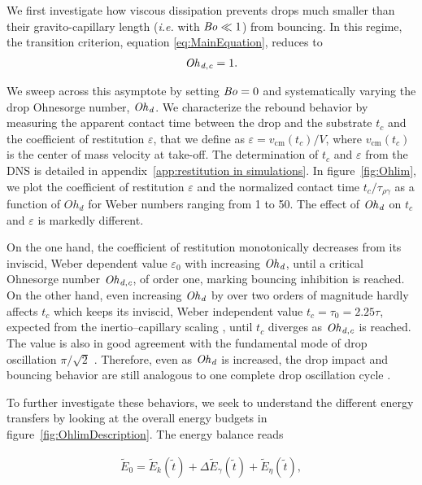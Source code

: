 We first investigate how viscous dissipation prevents drops much smaller than their gravito-capillary length (\emph{i.e.} with $\mathit{Bo} \ll 1$) from bouncing. In this regime, the transition criterion, equation \eqref{eq:MainEquation}, reduces to
\begin{align}
	\mathit{Oh}_\mathit{d,c} = 1.
\end{align}

\noindent We sweep across this asymptote by setting $\mathit{Bo} = 0$ and systematically varying the drop Ohnesorge number, $\mathit{Oh}_\mathit{d}$. We characterize the rebound behavior by measuring the apparent contact time between the drop and the substrate $t_c$ and the coefficient of restitution $\varepsilon$, that we define as $\varepsilon = v_\text{cm}(t_c)/V$, where $v_\text{cm}(t_c)$ is the center of mass velocity at take-off.
The determination of $t_c$ and $\varepsilon$ from the DNS is detailed in appendix~\ref{app:restitution in simulations}. In figure~\ref{fig:Ohlim}, we plot the coefficient of restitution $\varepsilon$ and the normalized contact time $t_c/\tau_{\rho\gamma}$ as a function of $Oh_d$ for Weber numbers ranging from 1 to 50. The effect of $\mathit{Oh}_\mathit{d}$ on $t_c$ and $\varepsilon$ is markedly different. 

On the one hand, the coefficient of restitution monotonically decreases from its inviscid, Weber dependent value $\varepsilon_0$ with increasing $\mathit{Oh}_\mathit{d}$, until a critical Ohnesorge number $\mathit{Oh}_\mathit{d,c}$, of order one, marking bouncing inhibition is reached. On the other hand, even increasing $\mathit{Oh}_\mathit{d}$ by over two orders of magnitude hardly affects $t_c$ which keeps its inviscid, Weber independent value $t_c = \tau_0 = 2.25\tau$, expected from the inertio--capillary scaling \citep{wachters1966heat, richard2002contact}, until $t_c$ diverges as $\mathit{Oh}_\mathit{d,c}$ is reached. The value is also in good agreement with the fundamental mode of drop oscillation $\pi/\sqrt 2$ \citep{rayleigh1879capillary}. Therefore, even as $\mathit{Oh}_\mathit{d}$ is increased, the drop impact and bouncing behavior are still analogous to one complete drop oscillation cycle \citep{jha2020viscous}. 

To further investigate these behaviors, we seek to understand the different energy transfers by looking at the overall energy budgets in figure~\ref{fig:OhlimDescription}. The energy balance reads

\begin{align}
	\label{eqn:OhEnergyBalance}
	\tilde{E}_0 = \tilde{E}_k(\tilde{t}) + \Delta\tilde{E}_\gamma(\tilde{t}) + \tilde{E}_\eta(\tilde{t}),
\end{align}

